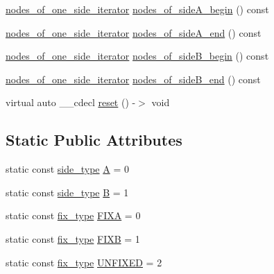 \begin{DoxyCompactItemize}
\mbox{\hyperlink{classfm__partition_ac8b7b5253476118e5f7bbad2fe8af285}{nodes\+\_\+of\+\_\+one\+\_\+side\+\_\+iterator}} \mbox{\hyperlink{classfm__partition_adad3bf33efb4a2b1b0feadeafb33f5fd}{nodes\+\_\+of\+\_\+side\+A\+\_\+begin}} () const
\item 
\mbox{\hyperlink{classfm__partition_ac8b7b5253476118e5f7bbad2fe8af285}{nodes\+\_\+of\+\_\+one\+\_\+side\+\_\+iterator}} \mbox{\hyperlink{classfm__partition_ac4202d1d929c1700985ad5d452b735fb}{nodes\+\_\+of\+\_\+side\+A\+\_\+end}} () const
\item 
\mbox{\hyperlink{classfm__partition_ac8b7b5253476118e5f7bbad2fe8af285}{nodes\+\_\+of\+\_\+one\+\_\+side\+\_\+iterator}} \mbox{\hyperlink{classfm__partition_a4e433456ed0214c04466c4f1060b0909}{nodes\+\_\+of\+\_\+side\+B\+\_\+begin}} () const
\item 
\mbox{\hyperlink{classfm__partition_ac8b7b5253476118e5f7bbad2fe8af285}{nodes\+\_\+of\+\_\+one\+\_\+side\+\_\+iterator}} \mbox{\hyperlink{classfm__partition_a9682b070cce104bdfe69e576df57f560}{nodes\+\_\+of\+\_\+side\+B\+\_\+end}} () const
\item 
virtual auto \+\_\+\+\_\+cdecl \mbox{\hyperlink{classfm__partition_a05ba0de86d7fe9c2de81b0681d8e0102}{reset}} () -\/$>$ void
\end{DoxyCompactItemize}
\subsection*{Static Public Attributes}
\begin{DoxyCompactItemize}
\item 
static const \mbox{\hyperlink{classfm__partition_a7cdff1bea3740a287387e8408e16ca79}{side\+\_\+type}} \mbox{\hyperlink{classfm__partition_a973d30e9eb0d21f659ef288176cd4791}{A}} = 0
\item 
static const \mbox{\hyperlink{classfm__partition_a7cdff1bea3740a287387e8408e16ca79}{side\+\_\+type}} \mbox{\hyperlink{classfm__partition_a42515c44eecb7ba3e2ec549a877ef238}{B}} = 1
\item 
static const \mbox{\hyperlink{classfm__partition_a63693cd93d587dca3d1842f831cd1c55}{fix\+\_\+type}} \mbox{\hyperlink{classfm__partition_a468a80e072d3ff18e5da33005825bcb1}{F\+I\+XA}} = 0
\item 
static const \mbox{\hyperlink{classfm__partition_a63693cd93d587dca3d1842f831cd1c55}{fix\+\_\+type}} \mbox{\hyperlink{classfm__partition_a0b9a66f0e8093ee83482f93d6aa5b2eb}{F\+I\+XB}} = 1
\item 
static const \mbox{\hyperlink{classfm__partition_a63693cd93d587dca3d1842f831cd1c55}{fix\+\_\+type}} \mbox{\hyperlink{classfm__partition_a24447561db0ea633212c597c5e1fca56}{U\+N\+F\+I\+X\+ED}} = 2
\end{DoxyCompactItemize}
